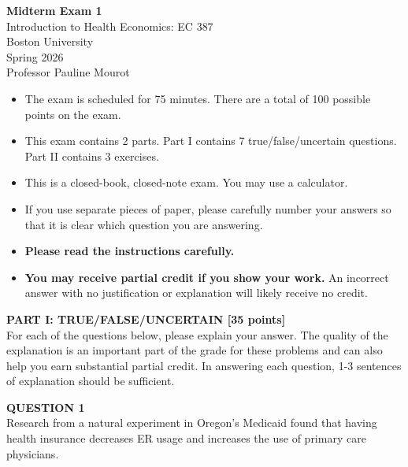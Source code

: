 \documentclass[12pt]{article}
\begin{document}
\begin{center}
\textbf{Midterm Exam 1} \\
Introduction to Health Economics: EC 387 \\
Boston University \\
Spring 2026 \\
Professor Pauline Mourot
\end{center}

\vspace{1em}

\begin{itemize}
  \item The exam is scheduled for 75 minutes. There are a total of 100 possible points on the exam.  

  \item This exam contains 2 parts. Part I contains 7 true/false/uncertain questions. Part II contains 3 exercises.

  \item This is a closed-book, closed-note exam. You may use a calculator.

  \item If you use separate pieces of paper, please carefully number your answers so that it is clear which question you are answering.  

  \item \textbf{Please read the instructions carefully.}

  \item \textbf{You may receive partial credit if you show your work.} An incorrect answer with no justification or explanation will likely receive no credit.
\end{itemize}

\vspace{5mm}


\noindent \textbf{PART I: TRUE/FALSE/UNCERTAIN [35 points]}\\

For each of the questions below, please explain your answer.
The quality of the explanation is an important part of the grade for these problems and
can also help you earn substantial partial credit.
In answering each question, 1-3 sentences of explanation should be sufficient.

\vspace{7mm}

\noindent \textbf{QUESTION 1}\\
Research from a natural experiment in Oregon's Medicaid found that having health insurance decreases ER usage and increases the use of primary care physicians.
\end{document}
